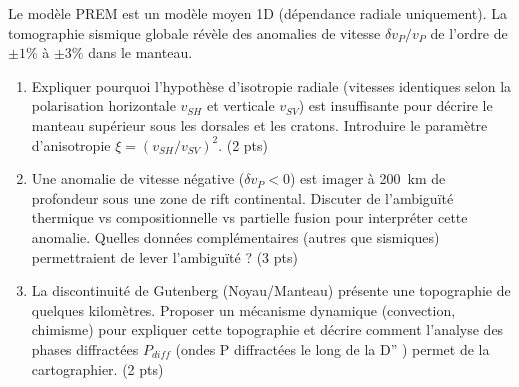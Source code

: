 \documentclass[11pt]{article}
\begin{document}
\begin{exercice}
Le modèle PREM est un modèle moyen 1D (dépendance radiale uniquement). La tomographie sismique globale révèle des anomalies de vitesse $\delta v_P / v_P$ de l'ordre de $\pm 1\%$ à $\pm 3\%$ dans le manteau.

\begin{enumerate}
    \item Expliquer pourquoi l'hypothèse d'isotropie radiale (vitesses identiques selon la polarisation horizontale $v_{SH}$ et verticale $v_{SV}$) est insuffisante pour décrire le manteau supérieur sous les dorsales et les cratons. Introduire le paramètre d'anisotropie $\xi = (v_{SH}/v_{SV})^2$. (2 pts)
    \item Une anomalie de vitesse négative ($\delta v_P < 0$) est imager à \SI{200}{km} de profondeur sous une zone de rift continental. Discuter de l'ambiguïté thermique vs compositionnelle vs partielle fusion pour interpréter cette anomalie. Quelles données complémentaires (autres que sismiques) permettraient de lever l'ambiguïté ? (3 pts)
    \item La discontinuité de Gutenberg (Noyau/Manteau) présente une topographie de quelques kilomètres. Proposer un mécanisme dynamique (convection, chimisme) pour expliquer cette topographie et décrire comment l'analyse des phases diffractées $P_{diff}$ (ondes P diffractées le long de la D'' ) permet de la cartographier. (2 pts)
\end{enumerate}
\end{exercice}
\end{document}
